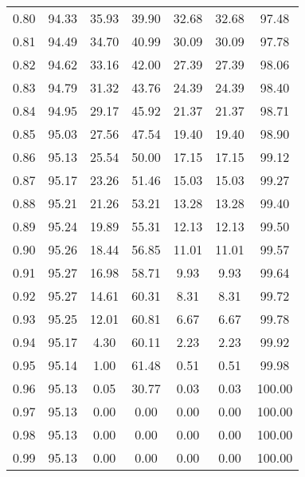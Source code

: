 \begin{tabular}{|c|c|c|c|c|c|c|}
      0.80 &     94.33 &     35.93 &      39.90 &   32.68 &      32.68 &         97.48 \\
      0.81 &     94.49 &     34.70 &      40.99 &   30.09 &      30.09 &         97.78 \\
      0.82 &     94.62 &     33.16 &      42.00 &   27.39 &      27.39 &         98.06 \\
      0.83 &     94.79 &     31.32 &      43.76 &   24.39 &      24.39 &         98.40 \\
      0.84 &     94.95 &     29.17 &      45.92 &   21.37 &      21.37 &         98.71 \\
      0.85 &     95.03 &     27.56 &      47.54 &   19.40 &      19.40 &         98.90 \\
      0.86 &     95.13 &     25.54 &      50.00 &   17.15 &      17.15 &         99.12 \\
      0.87 &     95.17 &     23.26 &      51.46 &   15.03 &      15.03 &         99.27 \\
      0.88 &     95.21 &     21.26 &      53.21 &   13.28 &      13.28 &         99.40 \\
      0.89 &     95.24 &     19.89 &      55.31 &   12.13 &      12.13 &         99.50 \\
      0.90 &     95.26 &     18.44 &      56.85 &   11.01 &      11.01 &         99.57 \\
      0.91 &     95.27 &     16.98 &      58.71 &    9.93 &       9.93 &         99.64 \\
      0.92 &     95.27 &     14.61 &      60.31 &    8.31 &       8.31 &         99.72 \\
      0.93 &     95.25 &     12.01 &      60.81 &    6.67 &       6.67 &         99.78 \\
      0.94 &     95.17 &      4.30 &      60.11 &    2.23 &       2.23 &         99.92 \\
      0.95 &     95.14 &      1.00 &      61.48 &    0.51 &       0.51 &         99.98 \\
      0.96 &     95.13 &      0.05 &      30.77 &    0.03 &       0.03 &        100.00 \\
      0.97 &     95.13 &      0.00 &       0.00 &    0.00 &       0.00 &        100.00 \\
      0.98 &     95.13 &      0.00 &       0.00 &    0.00 &       0.00 &        100.00 \\
      0.99 &     95.13 &      0.00 &       0.00 &    0.00 &       0.00 &        100.00 \\
\bottomrule
\end{tabular}
